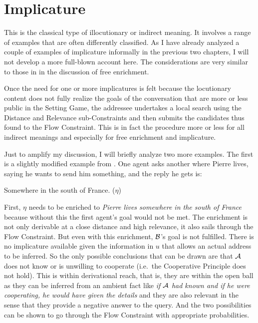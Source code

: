\chapter{Implicature} \label{ch:implicature}

This is the classical type of illocutionary or indirect meaning. It involves a range of examples that are often differently classified. As I have already analyzed a couple of examples of implicature informally in the previous two chapters, I will not develop a more full-blown account here. The considerations are very similar to those in  in the discussion of free enrichment.

Once the need for one or more implicatures is felt because the locutionary content does not fully realize the goals of the conversation that are more or less public in the Setting Game, the addressee undertakes a local search using the Distance and Relevance sub-Constraints and then submits the candidates thus found to the Flow Constraint. This is in fact the procedure more or less for all indirect meanings and especially for free enrichment and implicature.

Just to amplify my discussion, I will briefly analyze two more examples. The first is a slightly modified example from \citet{grice:lc}. One agent asks another where Pierre lives, saying he wants to send him something, and the reply he gets is:

\begin{exe}
\ex Somewhere in the south of France. ($\eta$)
\end{exe}

\noindent First, $\eta$ needs to be enriched to \emph{Pierre lives somewhere in the south of France} because without this the first agent's goal would not be met. The enrichment is not only derivable at a close distance and high relevance, it also sails through the Flow Constraint. But even with this enrichment, $\cal B$'s goal is not fulfilled. There is no implicature available given the information in $u$ that allows an actual address to be inferred. So the only possible conclusions that can be drawn are that $\cal A$ does not know or is unwilling to cooperate (i.e.\ the Cooperative Principle does not hold). This is within derivational reach, that is, they are within the open ball as they can be inferred from an ambient fact like \emph{if $\cal A$ had known and if he were cooperating, he would have given the details} and they are also relevant in the sense that they provide a negative answer to the query. And the two possibilities can be shown to go through the Flow Constraint with appropriate probabilities.

